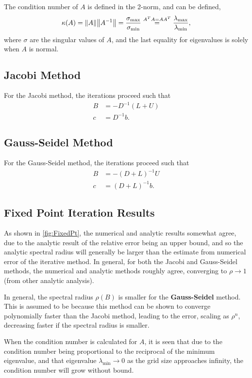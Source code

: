 \documentclass[12pt,letterpaper]{article}
\newcommand{\eqtxt}[1]{\overset{#1}=}
\begin{document}
The condition number of $A$ is defined in the 2-norm, and can be defined,
\begin{equation}
  \kappa(A) = \norm{A}\norm{A^{-1}} = \frac{\sigma_{\textrm{max}}}{\sigma_{\textrm{min}}} \eqtxt{A^TA=AA^T} \frac{\lambda_{\textrm{max}}}{\lambda_{\textrm{min}}},
\end{equation}
where $\sigma$ are the singular values of $A$, and the last equality for eigenvalues is solely when $A$ is normal.


\subsection{Jacobi Method}
For the Jacobi method, the iterations proceed such that
\begin{align}
  B &= -D^{-1}(L+U) \\
  c &= D^{-1}b.
\end{align}



\subsection{Gauss-Seidel Method}
For the Gauss-Seidel method, the iterations proceed such that
\begin{align}
  B &= -(D+L)^{-1}U \\
  c &= (D+L)^{-1}b.
\end{align}


\subsection{Fixed Point Iteration Results}
As shown in \cref{fig:FixedPt}, the numerical and analytic results somewhat agree, due to the analytic result of the relative error being an upper bound, and so the analytic spectral radius will generally be larger than the estimate from numerical error of the iterative method. In general, for both the Jacobi and Gauss-Seidel methods, the numerical and analytic methods roughly agree, converging to $\rho \to 1$ (from other analytic analysis).

In general, the spectral radius $\rho(B)$ is smaller for the \textbf{Gauss-Seidel} method. This is assumed to be because this method can be shown to converge polynomially faster than the Jacobi method, leading to the error, scaling as $\rho^n$, decreasing faster if the spectral radius is smaller.


When the condition number is calculated for $A$, it is seen that due to the condition number being proportional to the reciprocal of the minimum eigenvalue, and that eigenvalue $\lambda_{\textrm{min}} \to 0$ as the grid size approaches infinity, the condition number will grow without bound. 
\end{document}
